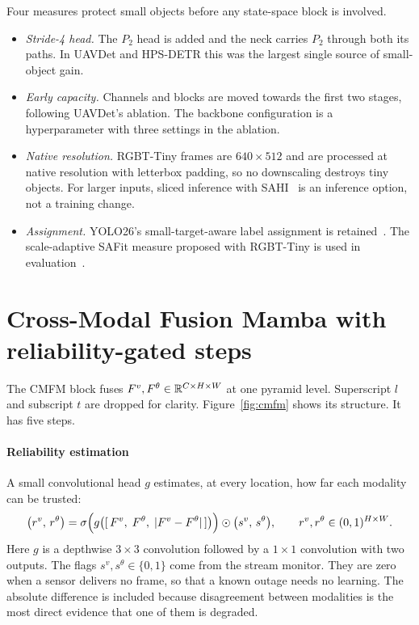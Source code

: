 Four measures protect small objects before any state-space block is
involved.
\begin{itemize}
  \item \emph{Stride-4 head.} The $P_2$ head is added and the neck carries
        $P_2$ through both its paths. In UAVDet and HPS-DETR this was the
        largest single source of small-object gain.
  \item \emph{Early capacity.} Channels and blocks are moved towards the
        first two stages, following UAVDet's ablation. The backbone
        configuration is a hyperparameter with three settings in the
        ablation.
  \item \emph{Native resolution.} RGBT-Tiny frames are $640\times512$ and
        are processed at native resolution with letterbox padding, so no
        downscaling destroys tiny objects. For larger inputs, sliced
        inference with SAHI~\citep{akyon2022sahi} is an inference option,
        not a training change.
  \item \emph{Assignment.} YOLO26's small-target-aware label assignment is
        retained~\citep{yolo26_2026}. The scale-adaptive SAFit measure
        proposed with RGBT-Tiny is used in evaluation~\citep{ying2025rgbttiny}.
\end{itemize}

\section{Cross-Modal Fusion Mamba with reliability-gated steps}
\label{sec:cmfm}

The CMFM block fuses $F^v, F^\theta \in \mathbb{R}^{C\times H\times W}$ at one pyramid
level. Superscript $l$ and subscript $t$ are dropped for clarity.
Figure~\ref{fig:cmfm} shows its structure. It has five steps.

\paragraph{Reliability estimation}
A small convolutional head $g$ estimates, at every location, how far each
modality can be trusted:
\begin{equation}
  \bigl(r^v,\, r^\theta\bigr) = \sigma\Bigl(g\bigl([\,F^v,\; F^\theta,\; |F^v-F^\theta|\,]\bigr)\Bigr)
  \odot \bigl(s^v,\, s^\theta\bigr),
  \qquad r^v, r^\theta \in (0,1)^{H\times W}.
  \label{eq:rel}
\end{equation}
Here $g$ is a depthwise $3\times3$ convolution followed by a $1\times1$
convolution with two outputs. The flags $s^v, s^\theta\in\{0,1\}$ come from
the stream monitor. They are zero when a sensor delivers no frame, so that a
known outage needs no learning. The absolute difference is included because
disagreement between modalities is the most direct evidence that one of
them is degraded.

